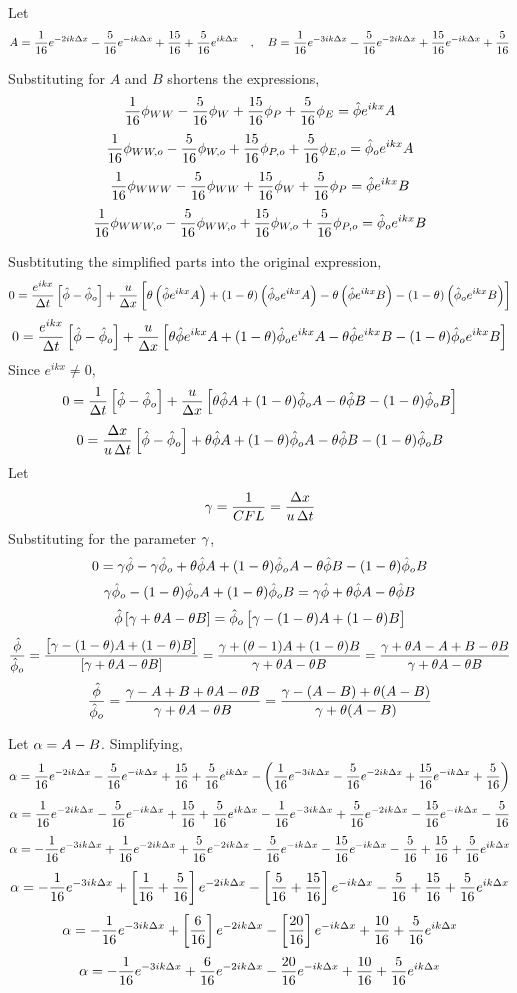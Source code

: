 \documentclass[a4paper, 12pt]{report}
\begin{document}
\begin{center}
Let$$A = \frac{1}{16}e^{-2ik\Delta x} - \frac{5}{16}e^{-ik\Delta x} + \frac{15}{16} + \frac{5}{16}e^{ik\Delta x} \quad,\quad B = \frac{1}{16}e^{-3ik\Delta x} - \frac{5}{16}e^{-2ik\Delta x} + \frac{15}{16}e^{-ik\Delta x} + \frac{5}{16}$$

Substituting for $A$ and $B$ shortens the expressions,
$$\frac{1}{16}\phi_{WW} - \frac{5}{16}\phi_{W} + \frac{15}{16}\phi_{P} + \frac{5}{16}\phi_{E} = \hat{\phi}e^{ikx}A$$
$$\frac{1}{16}\phi_{WW,o} - \frac{5}{16}\phi_{W,o} + \frac{15}{16}\phi_{P,o} + \frac{5}{16}\phi_{E,o} = \hat{\phi}_oe^{ikx}A$$
$$\frac{1}{16}\phi_{WWW} - \frac{5}{16}\phi_{WW} + \frac{15}{16}\phi_{W} + \frac{5}{16}\phi_{P} = \hat{\phi}e^{ikx}B$$
$$\frac{1}{16}\phi_{WWW,o} - \frac{5}{16}\phi_{WW,o} + \frac{15}{16}\phi_{W,o} + \frac{5}{16}\phi_{P,o} = \hat{\phi}_oe^{ikx}B$$

Susbtituting the simplified parts into the original expression,
$$0 = \frac{e^{ikx}}{\Delta t}\left[\hat{\phi} - \hat{\phi}_o\right] + \frac{u}{\Delta x}\left[\theta\left(\hat{\phi}e^{ikx}A\right) + (1-\theta)\left(\hat{\phi}_oe^{ikx}A\right) - \theta\left(\hat{\phi}e^{ikx}B\right) - (1-\theta)\left(\hat{\phi}_oe^{ikx}B\right)\right]$$
$$0 = \frac{e^{ikx}}{\Delta t}\left[\hat{\phi} - \hat{\phi}_o\right] + \frac{u}{\Delta x}\left[\theta\hat{\phi}e^{ikx}A + (1-\theta)\hat{\phi}_oe^{ikx}A - \theta\hat{\phi}e^{ikx}B - (1-\theta)\hat{\phi}_oe^{ikx}B\right]$$
Since $e^{ikx}\neq 0$,
$$0 = \frac{1}{\Delta t}\left[\hat{\phi} - \hat{\phi}_o\right] + \frac{u}{\Delta x}\left[\theta\hat{\phi}A + (1-\theta)\hat{\phi}_oA - \theta\hat{\phi}B - (1-\theta)\hat{\phi}_oB\right]$$
$$0 = \frac{\Delta x}{u\,\Delta t}\left[\hat{\phi} - \hat{\phi}_o\right] + \theta\hat{\phi}A + (1-\theta)\hat{\phi}_oA - \theta\hat{\phi}B - (1-\theta)\hat{\phi}_oB$$
Let 
$$\gamma = \frac{1}{CFL} = \frac{\Delta x}{u\,\Delta t}$$
Substituting for the parameter $\gamma$,
$$0 = \gamma\hat{\phi} - \gamma\hat{\phi}_o + \theta\hat{\phi}A + (1-\theta)\hat{\phi}_oA - \theta\hat{\phi}B - (1-\theta)\hat{\phi}_oB$$
$$\gamma\hat{\phi}_o - (1-\theta)\hat{\phi}_oA + (1-\theta)\hat{\phi}_oB = \gamma\hat{\phi} + \theta\hat{\phi}A - \theta\hat{\phi}B$$
$$\hat{\phi}\left[\gamma + \theta A - \theta B\right] = \hat{\phi}_o\left[\gamma - (1-\theta)A + (1-\theta)B\right]$$
$$\frac{\hat{\phi}}{\hat{\phi}_o} = \frac{\left[\gamma - (1-\theta)A + (1-\theta)B\right]}{\left[\gamma + \theta A - \theta B\right]} = \frac{\gamma + (\theta-1)A + (1-\theta)B}{\gamma + \theta A - \theta B} = \frac{\gamma + \theta A - A + B-\theta B}{\gamma + \theta A - \theta B}$$
$$\frac{\hat{\phi}}{\hat{\phi}_o} = \frac{\gamma - A + B + \theta A - \theta B}{\gamma + \theta A - \theta B} = \frac{\gamma - (A - B) + \theta(A - B)}{\gamma + \theta(A - B)}$$

Let $\alpha = A-B$. Simplifying,
$$\alpha = \frac{1}{16}e^{-2ik\Delta x} - \frac{5}{16}e^{-ik\Delta x} + \frac{15}{16} + \frac{5}{16}e^{ik\Delta x} - \left(\frac{1}{16}e^{-3ik\Delta x} - \frac{5}{16}e^{-2ik\Delta x} + \frac{15}{16}e^{-ik\Delta x} + \frac{5}{16}\right)$$
$$\alpha = \frac{1}{16}e^{-2ik\Delta x} - \frac{5}{16}e^{-ik\Delta x} + \frac{15}{16} + \frac{5}{16}e^{ik\Delta x} - \frac{1}{16}e^{-3ik\Delta x} + \frac{5}{16}e^{-2ik\Delta x} - \frac{15}{16}e^{-ik\Delta x} - \frac{5}{16}$$
$$\alpha = - \frac{1}{16}e^{-3ik\Delta x} + \frac{1}{16}e^{-2ik\Delta x} + \frac{5}{16}e^{-2ik\Delta x} - \frac{5}{16}e^{-ik\Delta x} - \frac{15}{16}e^{-ik\Delta x} - \frac{5}{16} + \frac{15}{16} + \frac{5}{16}e^{ik\Delta x}$$
$$\alpha = - \frac{1}{16}e^{-3ik\Delta x} + \left[\frac{1}{16} + \frac{5}{16}\right]e^{-2ik\Delta x} - \left[\frac{5}{16} + \frac{15}{16}\right]e^{-ik\Delta x}  - \frac{5}{16} + \frac{15}{16} + \frac{5}{16}e^{ik\Delta x}$$
$$\alpha = - \frac{1}{16}e^{-3ik\Delta x} + \left[\frac{6}{16}\right]e^{-2ik\Delta x} - \left[\frac{20}{16}\right]e^{-ik\Delta x} + \frac{10}{16} + \frac{5}{16}e^{ik\Delta x}$$
$$\alpha = - \frac{1}{16}e^{-3ik\Delta x} + \frac{6}{16}e^{-2ik\Delta x} - \frac{20}{16}e^{-ik\Delta x} + \frac{10}{16} + \frac{5}{16}e^{ik\Delta x}$$


\end{center}
\end{document}
